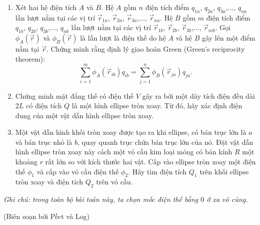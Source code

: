 \begin{enumerate}
    \item Xét hai hệ điện tích $A$ và $B$. Hệ $A$ gồm $n$ điện tích điểm $q_{1a}$, $q_{2a}$, $q_{3a}$,..., $q_{na}$ lần lượt nằm tại các vị trí  $\Vec{r}_{1a}$, $\Vec{r}_{2a}$,  $\Vec{r}_{3a}$,..., $\Vec{r}_{na}$. Hệ $B$ gồm $m$ điện tích điểm $q_{1b}$, $q_{2b}$, $q_{3b}$,..., $q_{nb}$ lần lượt nằm tại các vị trí  $\Vec{r}_{1b}$, $\Vec{r}_{2b}$,  $\Vec{r}_{3b}$,..., $\Vec{r}_{mb}$. Gọi $\phi_A (\Vec{r})$ và $\phi_B (\Vec{r})$ là lần lượt là điện thế do hệ $A$ và hệ $B$ gây lên một điểm nằm tại $\Vec{r}$. Chứng minh rằng định lý giao hoán Green (Green's reciprocity theorem):
    $$ \sum_{i=1}^m \phi_A (\Vec{r}_{ib}) q_{ib} = \sum_{j=1}^n \phi_B (\Vec{r}_{ja}) q_{ja}.$$
    \item Chứng minh mặt đẳng thế có điện thế $V$ gây ra bởi một dây tích điện đều dài $2L$ có điện tích $Q$ là một hình ellipse tròn xoay. Từ đó, hãy xác định điện dung của một vật dẫn hình ellipse tròn xoay.
    \item Một vật dẫn hình khối tròn xoay được tạo ra khi ellipse, có bán trục lớn là $a$ và bán trục nhỏ là $b$, quay quanh trục chứa bán trục lớn của nó. Đặt vật dẫn hình ellipse tròn xoay này cách một vỏ cầu kim loại mỏng có bán kính $R$ một khoảng $r$ rất lớn so với kích thước hai vật. Cấp vào ellipse tròn xoay một điện thế $\phi_1$ và cấp vào vỏ cầu điện thế $\phi_2$. Hãy tìm điện tích $Q_1$ trên khối ellipse tròn xoay và điện tích $Q_2$ trên vỏ cầu.
\end{enumerate}

\textit{Ghi chú: trong toàn bộ bài toán này, ta chọn mốc điện thế bằng $0$ ở xa vô cùng.}

\begin{flushright}
    (Biên soạn bởi Pềct và Log)
\end{flushright}